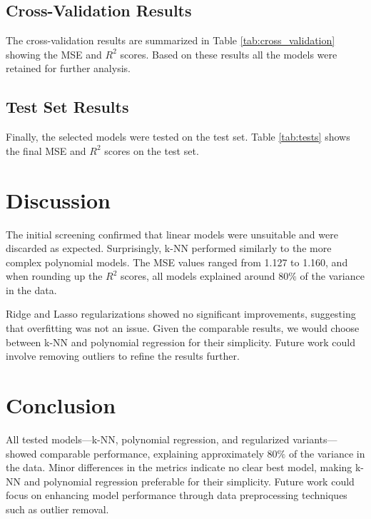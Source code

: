 \documentclass[twocolumn]{article}
\begin{document}


\subsection{Cross-Validation Results}
The cross-validation results are summarized in Table \ref{tab:cross_validation} showing the MSE and \( R^2 \) scores.
Based on these results all the models were retained for further analysis.



\subsection{Test Set Results}
Finally, the selected models were tested on the test set. Table \ref{tab:tests} shows the final MSE and \( R^2 \) scores on the test set.



\section{Discussion}
The initial screening confirmed that linear models were unsuitable and were discarded as expected. 
Surprisingly, k-NN performed similarly to the more complex polynomial models. The MSE values ranged from 1.127 to 1.160, and when rounding up the  \( R^2 \)  scores, all models 
explained around $80\%$ of the variance in the data.

Ridge and Lasso regularizations showed no significant improvements, suggesting that 
overfitting was not an issue. Given the comparable results, we would choose between k-NN and polynomial regression for their simplicity. 
Future work could involve removing outliers to refine the results further.

\section{Conclusion}
All tested models—k-NN, polynomial regression, and regularized variants—showed comparable performance,
 explaining approximately $80\%$ of the variance in the data. Minor differences in the metrics indicate no clear 
 best model, making k-NN and polynomial regression preferable for their simplicity. Future work could focus on enhancing 
 model performance through data preprocessing techniques such as outlier removal.
\end{document}

